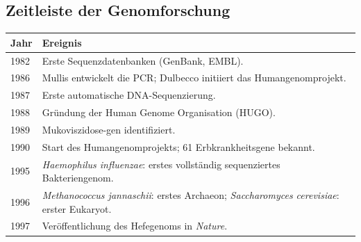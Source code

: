 \subsection*{Zeitleiste der Genomforschung}\label{subsec:zeitleiste-der-genomforschung}

\begin{mytable}
    \begin{tabular}{|p{2cm}|p{12cm}|}
        \hline
        \textbf{Jahr} & \textbf{Ereignis}                                                                                                                                        \\
        \hline
        1982          & Erste Sequenzdatenbanken (GenBank, EMBL).                                                                                                                \\
        1986          & Mullis entwickelt die PCR; Dulbecco initiiert das Humangenomprojekt.                                                                                     \\
        1987          & Erste automatische DNA-Sequenzierung.                                                                                                                    \\
        1988          & Gründung der Human Genome Organisation (HUGO).                                                                                                           \\
        1989          & Mukoviszidose-\gls{gen} identifiziert.                                                                                                                   \\
        1990          & Start des Humangenomprojekts; 61 Erbkrankheitsgene bekannt.                                                                                              \\
        1995          & \textit{Haemophilus influenzae}: erstes vollständig sequenziertes Bakteriengenom.                                                                        \\
        1996          & \textit{Methanococcus jannaschii}: erstes Archaeon; \textit{Saccharomyces cerevisiae}: erster Eukaryot.                                                  \\
        1997          & Veröffentlichung des Hefegenoms in \textit{Nature}.                                                                                                      \\

\end{tabular}
\end{mytable}
